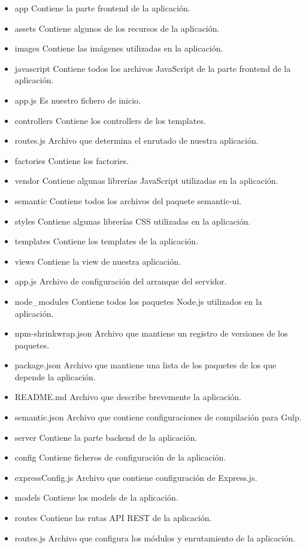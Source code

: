 \begin{itemize}
\item app
Contiene la parte frontend de la aplicación.
\item assets
Contiene algunos de los recursos de la aplicación.
\item images
Contiene las imágenes utilizadas en la aplicación.
\item javascript
Contiene todos los archivos JavaScript de la parte frontend de la aplicación.
\item app.js
Es nuestro fichero de inicio.
\item controllers
Contiene los controllers de los templates.
\item routes.js
Archivo que determina el enrutado de nuestra aplicación.
\item factories
Contiene los factories.
\item vendor
Contiene algunas librerías JavaScript utilizadas en la aplicación.
\item semantic
Contiene todos los archivos del paquete semantic-ui.
\item styles
Contiene algunas librerías CSS utilizadas en la aplicación.
\item templates
Contiene los templates de la aplicación.
\item views
Contiene la view de nuestra aplicación.
\item app.js
Archivo de configuración del arranque del servidor.
\item node\_modules
Contiene todos los paquetes Node.js utilizados en la aplicación.
\item npm-shrinkwrap.json
Archivo que mantiene un registro de versiones de los paquetes. 
\item package.json
Archivo que mantiene una lista de los paquetes de los que depende la aplicación.
\item README.md
Archivo que describe brevemente la aplicación.
\item semantic.json
Archivo que contiene configuraciones de compilación para Gulp.
\item server
Contiene la parte backend de la aplicación.
\item config
Contiene ficheros de configuración de la aplicación.
\item expressConfig.js
Archivo que contiene configuración de Express.js.
\item models
Contiene los models de la aplicación.
\item routes
Contiene las rutas API REST de la aplicación.
\item routes.js
Archivo que configura los módulos y enrutamiento de la aplicación.
\end{itemize}


